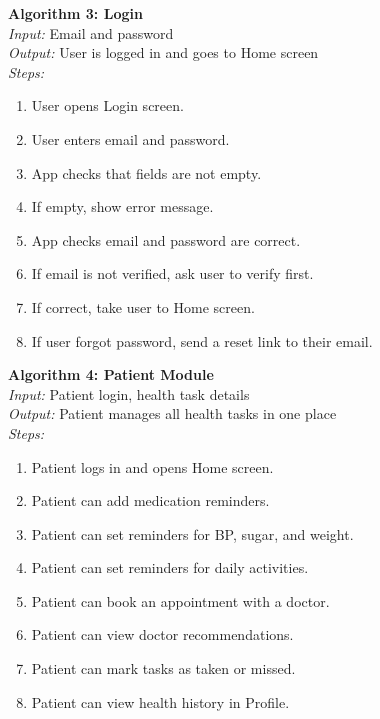 \documentclass[12pt, a4paper, oneside]{report}
\begin{document}
\textbf{Algorithm 3: Login}\\
\textit{Input:} Email and password\\
\textit{Output:} User is logged in and goes to Home screen\\
\textit{Steps:}
\begin{enumerate}
    \item User opens Login screen.
    \item User enters email and password.
    \item App checks that fields are not empty.
    \item If empty, show error message.
    \item App checks email and password are correct.
    \item If email is not verified, ask user to verify first.
    \item If correct, take user to Home screen.
    \item If user forgot password, send a reset link to their email.
\end{enumerate}

\textbf{Algorithm 4: Patient Module}\\
\textit{Input:} Patient login, health task details\\
\textit{Output:} Patient manages all health tasks in one place\\
\textit{Steps:}
\begin{enumerate}
    \item Patient logs in and opens Home screen.
    \item Patient can add medication reminders.
    \item Patient can set reminders for BP, sugar, and weight.
    \item Patient can set reminders for daily activities.
    \item Patient can book an appointment with a doctor.
    \item Patient can view doctor recommendations.
    \item Patient can mark tasks as taken or missed.
    \item Patient can view health history in Profile.
\end{enumerate}
\end{document}
